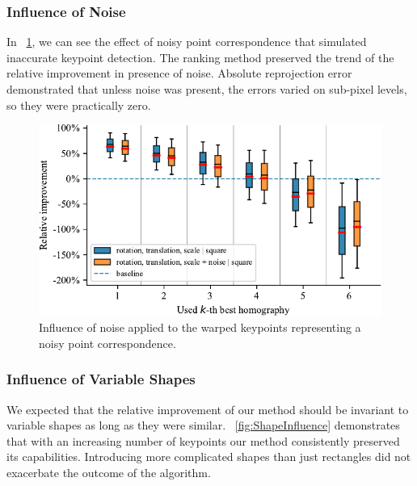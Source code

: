\subsubsection{Influence of Noise}

In \figtext{}~\ref{fig:NoiseInfluence}, we can see the effect of noisy point correspondence that simulated inaccurate keypoint detection. The ranking method preserved the trend of the relative improvement in presence of noise. Absolute reprojection error demonstrated that unless noise was present, the errors varied on sub-pixel levels, so they were practically zero.

\begin{figure}[t]
    \centering
    \includegraphics[width=\boxplotimgwidth]{figures/homography/noise_influence.pdf}
    \caption[Influence of noise]{Influence of noise applied to the warped keypoints representing a noisy point correspondence.}
    \label{fig:NoiseInfluence}
\end{figure}

\subsubsection{Influence of Variable Shapes}

We expected that the relative improvement of our method should be invariant to variable shapes as long as they were similar. \figtext{}~\ref{fig:ShapeInfluence} demonstrates that with an increasing number of keypoints our method consistently preserved its capabilities. Introducing more complicated shapes than just rectangles did not exacerbate the outcome of the algorithm.

